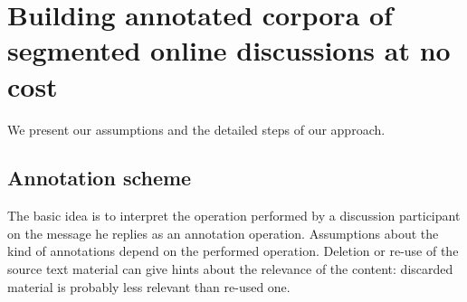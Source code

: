 

\section{Building annotated corpora of segmented online discussions at no cost}
\label{sec:buildingannotatedcorpusofsegmentedonlinemessageatnocost}

We present our assumptions and the detailed steps of our approach.

\subsection{Annotation scheme}
\label{sec:annotationscheme}


The basic idea is to interpret the operation performed by a discussion participant on the message he replies as an annotation operation. 
Assumptions about the kind of annotations depend on the performed operation.
Deletion or re-use of the source text material can give hints about the relevance of the content: discarded material is probably less relevant than re-used one.

